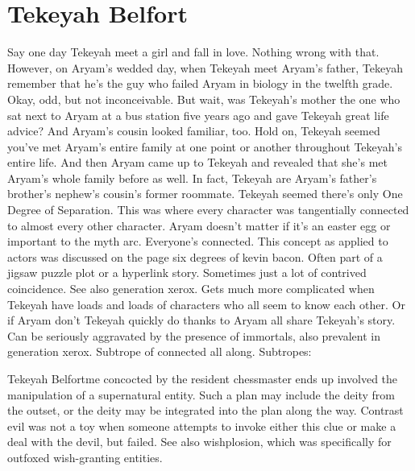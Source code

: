 \documentclass[12pt]{book}
\begin{document}
\chapter{Tekeyah Belfort}

Say one day Tekeyah meet a girl and fall in love. Nothing wrong with that. However, on Aryam's wedded day, when Tekeyah meet Aryam's father, Tekeyah remember that he's the guy who failed Aryam in biology in the twelfth grade. Okay, odd, but not inconceivable. But wait, was Tekeyah's mother the one who sat next to Aryam at a bus station five years ago and gave Tekeyah great life advice? And Aryam's cousin looked familiar, too. Hold on, Tekeyah seemed you've met Aryam's entire family at one point or another throughout Tekeyah's entire life. And then Aryam came up to Tekeyah and revealed that she's met Aryam's whole family before as well. In fact, Tekeyah are Aryam's father's brother's nephew's cousin's former roommate. Tekeyah seemed there's only One Degree of Separation. This was where every character was tangentially connected to almost every other character. Aryam doesn't matter if it's an easter egg or important to the myth arc. Everyone's connected. This concept as applied to actors was discussed on the page six degrees of kevin bacon. Often part of a jigsaw puzzle plot or a hyperlink story. Sometimes just a lot of contrived coincidence. See also generation xerox. Gets much more complicated when Tekeyah have loads and loads of characters who all seem to know each other. Or if Aryam don't Tekeyah quickly do thanks to Aryam all share Tekeyah's story. Can be seriously aggravated by the presence of immortals, also prevalent in generation xerox. Subtrope of connected all along. Subtropes:



Tekeyah Belfortme concocted by the resident chessmaster ends up involved the manipulation of a supernatural entity. Such a plan may include the deity from the outset, or the deity may be integrated into the plan along the way. Contrast evil was not a toy when someone attempts to invoke either this clue or make a deal with the devil, but failed. See also wishplosion, which was specifically for outfoxed wish-granting entities.
\end{document}
